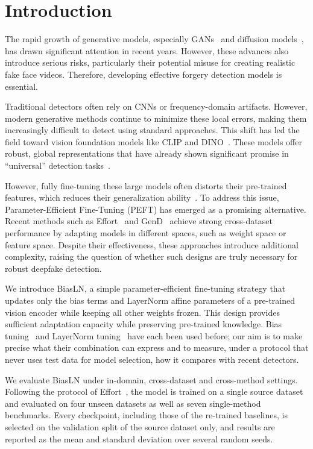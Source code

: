 \documentclass[fonts]{icst}
\newif\ifrevmark\revmarkfalse
\newcommand{\rev}[1]{\ifrevmark{\color{revblue}#1}\else#1\fi}
\begin{document}
\section{Introduction}
The rapid growth of generative models, especially GANs~\cite{goodfellow2020gan} and diffusion models~\cite{yang2022diffusion}, has drawn significant attention in recent years. However, these advances also introduce serious risks, particularly their potential misuse for creating realistic fake face videos. Therefore, developing effective forgery detection models is essential.

Traditional detectors often rely on CNNs or frequency-domain artifacts. However, modern generative methods continue to minimize these local errors, making them increasingly difficult to detect using standard approaches.
This shift has led the field toward vision foundation models like CLIP and DINO~\cite{radford2021clip_vitl,caron2021emerging}.
These models offer robust, global representations that have already shown significant promise in ``universal'' detection tasks~\cite{ojha2023universal}.

However, fully fine-tuning these large models often \rev{distorts their pre-trained features}, which reduces their generalization ability~\cite{kumar2022finetuning}.
To address this issue, Parameter-Efficient Fine-Tuning (PEFT) has emerged as a promising alternative. Recent methods such as Effort~\cite{yan2025effort} and GenD~\cite{yermakov2025gend} achieve strong cross-dataset performance by adapting models in different spaces, such as weight space or feature space.
Despite their effectiveness, these approaches introduce additional complexity, raising the question of whether such designs are truly necessary for robust deepfake detection.

We introduce BiasLN, a simple parameter-efficient fine-tuning strategy that updates only the bias terms and LayerNorm affine parameters of a pre-trained vision encoder while keeping all other weights frozen. This design provides sufficient adaptation capacity while preserving pre-trained knowledge. \rev{Bias tuning~\cite{benzaken2022bitfit} and LayerNorm tuning~\cite{wang2022ln,yermakov2025gend} have each been used before; our aim is to make precise what their combination can express and to measure, under a protocol that never uses test data for model selection, how it compares with recent detectors.}

We evaluate BiasLN under in-domain, cross-dataset and cross-method settings. Following the protocol of Effort~\cite{yan2025effort}, the model is trained on a single source dataset \rev{and evaluated on four unseen datasets as well as seven single-method benchmarks. Every checkpoint, including those of the re-trained baselines, is selected on the validation split of the source dataset only, and results are reported as the mean and standard deviation over several random seeds.}
\end{document}
